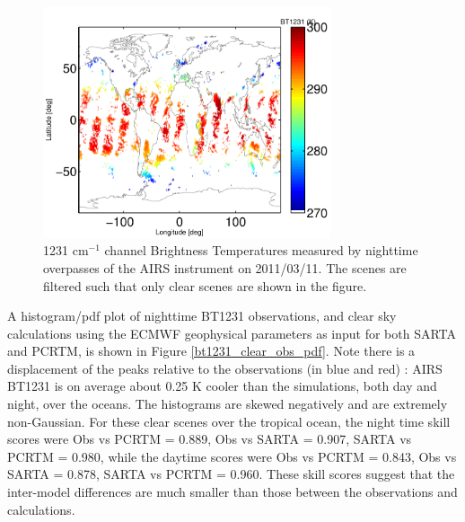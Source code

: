 \documentclass[agupp]{aguplus}              %
\newcommand{\wn}{cm$^{-1}$\xspace}
\begin{document}
\begin{article}
\begin{figure}[h]
\noindent\includegraphics[width=20pc]{FIGS/ecm_clearBT1231v2.pdf}
\caption{1231 \wn channel Brightness Temperatures measured by nighttime overpasses of the
AIRS instrument on 2011/03/11. The scenes are filtered such that only clear scenes are shown 
in the figure.}
\label{bt1231_clear_obs}
\end{figure}

A histogram/pdf plot of nighttime BT1231 observations, and clear sky
calculations using the ECMWF geophysical parameters as input for both
SARTA and PCRTM, is shown in Figure \ref{bt1231_clear_obs_pdf}. Note
there is a displacement of the peaks relative to the observations (in
blue and red) : AIRS BT1231 is on average about 0.25 K cooler than the
simulations, both day and night, over the oceans. The histograms are
skewed negatively and are extremely non-Gaussian. For these clear
scenes over the tropical ocean, the night time skill scores were Obs
vs PCRTM = 0.889, Obs vs SARTA = 0.907, SARTA vs PCRTM = 0.980, while
the daytime scores were Obs vs PCRTM = 0.843, Obs vs SARTA = 0.878,
SARTA vs PCRTM = 0.960. These skill scores suggest that the
inter-model differences are much smaller than those between the
observations and calculations.



\end{article}
\end{document}
